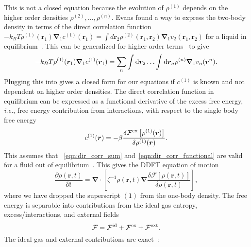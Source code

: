 %
This is not a closed equation because the evolution of $\rho^{(1)}$ depends on
the higher order densities $\rho^{(2)}, \ldots, \rho^{(n)}$. Evans found a way
to express the two-body density in terms of the direct correlation function
$-k_B T \rho^{(1)}(\bm{r}_1) \bm{\nabla}_1 c^{(1)}(\bm{r}_1) = \int d \bm{r}_2
\rho^{(2)}(\bm{r}_1,\bm{r}_2) \bm{\nabla}_1 v_2 (\bm{r}_1, \bm{r}_2 )$ for a
liquid in equilibrium~\cite{evans_nature_79}.  This can be generalized for
higher order terms~\cite{archer_dynamical_04} to give
%
\begin{equation}
  \label{eqn:dir_corr_sum}
  -k_B T \rho^{(1)}(\bm{r}_1) \bm{\nabla}_1 c^{(1)}(\bm{r}_1) = 
  \sum_n \int \mathop{}\!\mathrm{d} \bm{r}_2 \ldots 
  \int \mathop{}\!\mathrm{d} \bm{r}_n \rho^{(n)} \bm{\nabla}_1 v_n (\bm{r}^n).
\end{equation}
%
Plugging this into  gives a closed form for our equations
if $c^{(1)}$ is known and not dependent on
higher order densities.  The direct
correlation function in equilibrium can be expressed as a functional derivative
of the excess free energy, \textit{i.e.}, free energy contribution from
interactions, with respect to the single body free
energy~\cite{evans_nature_79, hansen_theory_06, marconi_dynamic_99,
  marconi_dynamic_00}
%
\begin{equation}
  \label{eqn:dir_corr_functional}
  c^{(1)}(\bm{r}) = -\beta \frac{\delta \mathcal{F}^{\mathrm{ex}} 
      \left[ \rho^{(1)}(\bm{r}) \right] }
  {\delta \rho^{(1)} (\bm{r} ) }.
\end{equation}
%
This assumes that \eqn~\ref{eqn:dir_corr_sum} and~\ref{eqn:dir_corr_functional}
are valid for a fluid out of equilibrium~\cite{archer_dynamical_04}.  This gives
the DDFT equation of motion~\cite{evans_nature_79,
  marconi_dynamic_99, marconi_dynamic_00, archer_dynamical_04}
%
\begin{equation}
  \frac{\partial \rho(\bm{r},t)}{\partial t} = 
  \bm{\nabla} \cdot \left[ \zeta^{-1} \rho(\bm{r},t) \bm{\nabla} 
    \frac{\delta \mathcal{F} \left[ \rho (\bm{r},t) \right] }
  {\delta \rho (\bm{r}, t ) } \right],
\end{equation}
%
where we have dropped the superscript $(1)$ from the one-body density.  The free
energy is separable into contributions from the ideal gas entropy,
excess/interactions, and external fields~\cite{hansen_theory_06}
%
\begin{equation}
  \mathcal{F} = \mathcal{F}^{\mathrm{id}} + \mathcal{F}^{\mathrm{ex}}
  +\mathcal{F}^{\mathrm{ext}}.
\end{equation}
%
The ideal gas and external contributions are exact~\cite{hansen_theory_06,
  archer_dynamical_04}:
